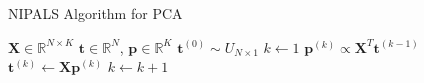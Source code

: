 \begin{algorithm}[H]
\caption{NIPALS Algorithm for PCA}
\label{algorithm.3.1}
\begin{algorithmic}[1]
\REQUIRE $\mathbf{X} \in \mathbb{R}^{N \times K}$
\ENSURE $\mathbf{t} \in \mathbb{R}^N$, $\mathbf{p} \in \mathbb{R}^K$
\STATE $\mathbf{t}^{(0)} \sim U_{N \times 1}$ 
\STATE $k \gets 1$
\REPEAT
  \STATE $\mathbf{p}^{(k)} \propto \mathbf{X}^T \mathbf{t}^{(k-1)}$
  \STATE $\mathbf{t}^{(k)} \gets \mathbf{X} \mathbf{p}^{(k)}$
  \STATE $k \gets k + 1$
\end{algorithmic}
\end{algorithm}

